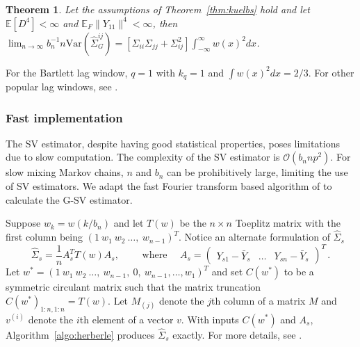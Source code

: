 \documentclass[12pt]{article}
\newcommand{\E}{\mathbb{E}}
\newcommand{\Var}{\text{Var}}
\newtheorem{theorem}{Theorem}
\theoremstyle{remark}
\begin{document}
\begin{theorem} \label{th:G-SVE_variance}
 Let the assumptions of Theorem~\ref{thm:kuelbs} hold and let $\E[D^4] < \infty$  and  $\E_F \|Y_{11}\|^4 < \infty$, then $ \lim_{n \to \infty} b_n^{-1}{n}\Var \left(\hat{\Sigma}_{G}^{ij} \right) = [\Sigma_{ii}\Sigma_{jj} + \Sigma_{ij}^2]\int_{-\infty}^{\infty}w(x)^2dx $.
\end{theorem}
For the Bartlett lag window, $q = 1$ with $k_q = 1$ and $\int w(x)^2 dx = 2/3$. For other popular lag windows, see \cite{ande:1971}.

\subsubsection{Fast implementation} %
\label{ssub:fast_implementation}

The SV estimator, despite having good statistical properties, poses limitations due to slow computation. The complexity of the SV estimator is $\mathcal{O}(b_n n p^2)$. For slow mixing Markov chains, $n$ and $b_n$ can be prohibitively large, limiting the use of SV estimators.  We adapt the  fast Fourier transform based algorithm of \cite{heberle2017fast} to calculate the G-SV estimator.

 Suppose $w_k = w(k/b_n)$ and let $T(w)$ be the $n \times n$ Toeplitz matrix with the first column being $(1 ~ w_1 ~ w_2 ~ \dots, ~ w_{n-1})^T$. Notice an alternate formulation of $\hat{\Sigma}_s$
%
\begin{equation*} \label{eq:kyriakoulis}
    \hat{\Sigma}_s = \dfrac{1}{n}A_s^T T(w) A_s, \qquad \textrm{ where } \quad  A_s = \begin{pmatrix}
    Y_{s1} - \bar{Y}_s  & \dots & Y_{sn} - \bar{Y}_s
\end{pmatrix}^T \,.
\end{equation*}
 Let $w^* = (1 ~ w_1 ~ w_2 ~ \dots, ~ w_{n-1}, ~0, ~w_{n-1}, \dots, w_1)^T$ and set $C(w^*)$ to be a symmetric circulant matrix such that the matrix truncation $C(w^*)_{1:n, 1:n} = T(w)$. Let $M_{(j)}$ denote the $j$th column of a matrix $M$ and $v^{(i)}$ denote the $i$th element of a vector $v$. With inputs $C(w^*)$ and $A_s$, Algorithm~\ref{algo:herberle} produces $\hat{\Sigma}_s$ exactly. For more details, see \cite{heberle2017fast}.
\end{document}
